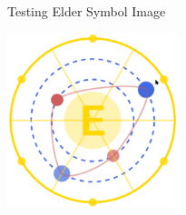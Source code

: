 \documentclass{article}
\begin{document}
\begin{center}
Testing Elder Symbol Image
\vspace{1cm}

\includegraphics[width=5cm]{figures/elder_symbol.pdf}
\end{center}
\end{document}
